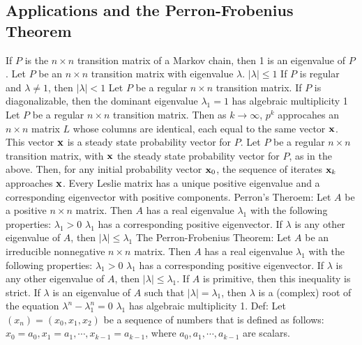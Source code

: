 \documentclass{article}
\begin{document}
    \subsection{Applications and the Perron-Frobenius Theorem}
    \begin{outline}
        \1 If \(P\) is the \(n\times n\) transition matrix of a Markov chain, then 1 is an eigenvalue of $P$. 
        \1 Let \(P\) be an \(n\times n\) transition matrix with eigenvalue \(\lambda\). 
            \2 \(|\lambda|\leq 1\) 
            \2 If $P$ is regular and \(\lambda\neq 1\), then \(|\lambda|<1\)
        \1 Let $P$ be a regular \(n\times n\) transition matrix. If $P$ is diagonalizable, then the dominant eigenvalue \(\lambda_1=1\) has algebraic multiplicity 1
        \1 Let $P$ be a regular \(n\times n\) transition matrix. Then as \(k\to \infty\), \(p^k\) approcahes an \(n\times n\) matrix $L$ whose columns are identical, each equal to the same vector \(\vb x\). This vector \(\vb x\) is a steady state probability vector for $P$. 
        \1 Let $P$ be a regular \(n\times n\) transition matrix, with \(\vb x\) the steady state probability vector for $P$, as in the above. Then, for any initial probability vector \(\vb x_0\), the sequence of iterates \(\vb x_k\) approaches \(\vb x\). 
        \1 Every Leslie matrix has a unique positive eigenvalue and a corresponding eigenvector with positive components. 
        \1 Perron's Theroem: Let $A$ be a positive \(n\times n\) matrix. Then \(A\) has a real eigenvalue \(\lambda_1\) with the following properties: 
            \2 \(\lambda_1>0\)
            \2 \(\lambda_1\) has a corresponding positive eigenvector. 
            \2 If \(\lambda\) is any other eigenvalue of $A$, then \(|\lambda|\leq\lambda_1\)
        \1 The Perron-Frobenius Theorem: Let \(A\) be an irreducible nonnegative \(n\times n\) matrix. Then \(A\) has a real eigenvalue \(\lambda_1\) with the following properties: 
            \2 \(\lambda_1>0\)
            \2 \(\lambda_1\) has a corresponding positive eigenvector. 
            \2 If \(\lambda\) is any other eigenvalue of $A$, then \(|\lambda|\leq\lambda_1\). If $A$ is primitive, then this inequality is strict. 
            \2 If \(\lambda\) is an eigenvalue of $A$ such that \(|\lambda|=\lambda_1\), then \(\lambda\) is a (complex) root of the equation \(\lambda^n-\lambda_1^n=0\)
            \2 \(\lambda_1\) has algebraic multiplicity 1. 
        \1 Def: Let \((x_n)=(x_0,x_1,x_2)\) be a sequence of numbers that is defined as follows: 
            \2 \(x_0=a_0,x_1=a_1,\cdots,x_{k-1}=a_{k-1}\), where \(a_0,a_1,\cdots,a_{k-1}\) are scalars. 

\end{outline}
\end{document}
